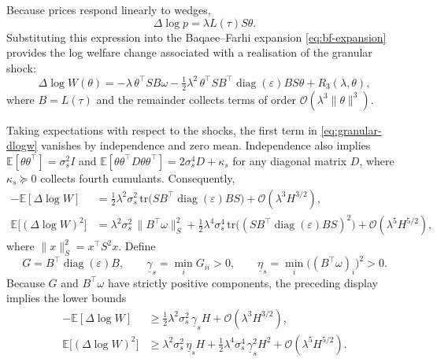 Because prices respond linearly to wedges,
\begin{equation*}
    \Delta\log p = \lambda L(\tau)S\theta.
\end{equation*}
Substituting this expression into the Baqaee--Farhi expansion \eqref{eq:bf-expansion} provides the log welfare change associated with a realisation of the granular shock:
\begin{equation}
\label{eq:granular-dlogw}
    \Delta \log W(\theta) = -\lambda\,\theta^{\top}S B\omega - \tfrac{1}{2}\lambda^2\,\theta^{\top} S B^{\top}\operatorname{diag}(\varepsilon) B S\theta + R_3(\lambda,\theta),
\end{equation}
where $B = L(\tau)$ and the remainder collects terms of order $\mathcal{O}(\lambda^3\|\theta\|^3)$.

Taking expectations with respect to the shocks, the first term in \eqref{eq:granular-dlogw} vanishes by independence and zero mean. Independence also implies $\mathbb{E}[\theta\theta^{\top}] = \sigma_s^2 I$ and $\mathbb{E}[\theta\theta^{\top}D\theta\theta^{\top}] = 2\sigma_s^4 D + \kappa_s$ for any diagonal matrix $D$, where $\kappa_s \succeq 0$ collects fourth cumulants. Consequently,
\begin{align*}
    -\mathbb{E}[\Delta \log W] &= \tfrac{1}{2}\lambda^2\sigma_s^2\,\mathrm{tr}\bigl(S B^{\top}\operatorname{diag}(\varepsilon) B S\bigr) + \mathcal{O}(\lambda^3 H^{3/2}), \\
    \mathbb{E}\bigl[(\Delta \log W)^2\bigr] &= \lambda^2\sigma_s^2\,\|B^{\top}\omega\|_{S}^2 + \tfrac{1}{2}\lambda^4\sigma_s^4\,\mathrm{tr}\bigl((S B^{\top}\operatorname{diag}(\varepsilon) B S)^2\bigr) + \mathcal{O}(\lambda^5 H^{5/2}),
\end{align*}
where $\|x\|_{S}^2 = x^{\top}S^2 x$. Define
\begin{equation*}
    G = B^{\top}\operatorname{diag}(\varepsilon) B, \qquad \underline{\gamma}_s = \min_i G_{ii} > 0, \qquad \underline{\eta}_s = \min_i \bigl((B^{\top}\omega)_i\bigr)^2 > 0.
\end{equation*}
Because $G$ and $B^{\top}\omega$ have strictly positive components, the preceding display implies the lower bounds
\begin{align*}
    -\mathbb{E}[\Delta \log W] &\geq \tfrac{1}{2}\lambda^2\sigma_s^2\,\underline{\gamma}_s H + \mathcal{O}(\lambda^3 H^{3/2}), \\
    \mathbb{E}\bigl[(\Delta \log W)^2\bigr] &\geq \lambda^2\sigma_s^2\,\underline{\eta}_s H + \tfrac{1}{2}\lambda^4\sigma_s^4\,\underline{\gamma}_s^2 H^2 + \mathcal{O}(\lambda^5 H^{5/2}).
\end{align*}

